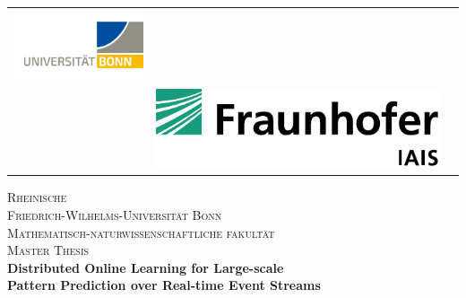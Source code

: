 \begin{titlepage}
		\begin{center}
			\setlength{\tabcolsep}{0pt}
			\begin{tabular}{>{\raggedleft}m{2.5cm}>{\centering}m{\dimexpr\textwidth - 5cm\relax}>{\raggedright}m{2.5cm}}
				\includegraphics[width=\linewidth]{chapters/figures/uni_bonn_logo_web.png}%
				&%
				\textbf{\large } \\[5pt]%
				\textbf{\large}%
				&%
				\includegraphics[width=\linewidth]{chapters/figures/iais.pdf} %
			\end{tabular}
			
			
			\textsc{\LARGE Rheinische\\[5mm] Friedrich-Wilhelms-Universität Bonn}\\[1.0cm]
			
			\textsc{\Large Mathematisch-naturwissenschaftliche fakultät}\\[1.0cm]
			
			\textsc{\Large Master Thesis}\\[1.5cm]
			
			{ \Large \bfseries 
				Distributed Online Learning for Large-scale  \\Pattern Prediction over Real-time Event Streams}\\[2.9cm]
			

\end{center}
\end{titlepage}
